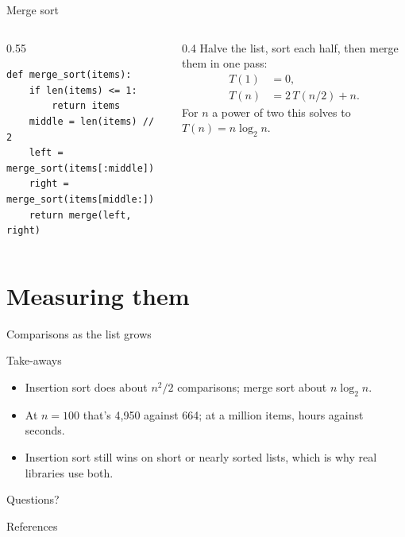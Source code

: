\documentclass[aspectratio=169,11pt]{beamer} %
\begin{document}
\begin{frame}[fragile]{Merge sort}
  \begin{columns}[T]
    \begin{column}{0.55\textwidth}
\begin{lstlisting}
def merge_sort(items):
    if len(items) <= 1:
        return items
    middle = len(items) // 2
    left = merge_sort(items[:middle])
    right = merge_sort(items[middle:])
    return merge(left, right)
\end{lstlisting}
    \end{column}
    \begin{column}{0.4\textwidth}
      Halve the list, sort each half, then merge them in one pass:
      \begin{align*}
        T(1) &= 0, \\
        T(n) &= 2\,T(n/2) + n.
      \end{align*}
      For $n$ a power of two this solves to $T(n) = n \log_2 n$.
    \end{column}
  \end{columns}
\end{frame}

\section{Measuring them}

\begin{frame}{Comparisons as the list grows}
  \centering
\end{frame}

\begin{frame}{Take-aways}
  \begin{itemize}
    \item Insertion sort does about $n^2/2$ comparisons; merge sort about $n \log_2 n$.
    \item At $n = 100$ that's 4,950 against 664; at a million items, hours against seconds.
    \item Insertion sort still wins on short or nearly sorted lists, which is why real libraries use both.
  \end{itemize}
  \vfill
  \centering
  \Large Questions?
\end{frame}

\begin{frame}[allowframebreaks]{References}
\printbibliography[heading=none]
\end{frame}
\end{document}
